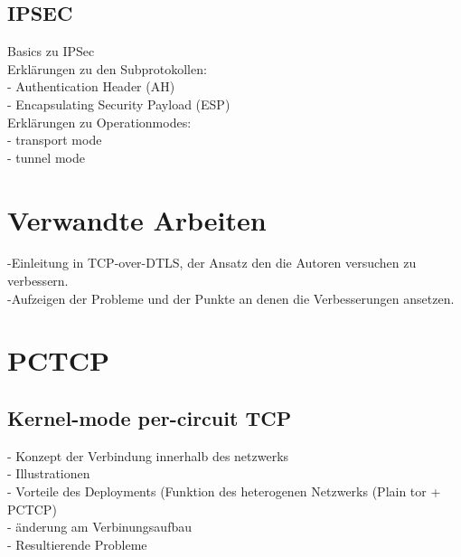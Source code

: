 \documentclass[fleqn,envcountsame,runningheads,10pt,a4paper]{llncs}
\begin{document}
\subsection{IPSEC}
\label{sec:ipsec}

Basics zu IPSec\\
Erklärungen zu den Subprotokollen:\\
- Authentication Header (AH)\\
- Encapsulating Security Payload (ESP)\\
Erklärungen zu Operationmodes:\\
- transport mode\\
- tunnel mode\\

\section{Verwandte Arbeiten}
\label{sec:realtedwork}

-Einleitung in TCP-over-DTLS, der Ansatz den die Autoren versuchen zu verbessern. \\
-Aufzeigen der Probleme und der Punkte an denen die Verbesserungen ansetzen.\\

\section{PCTCP}
\label{sec:pctcp}



\subsection{Kernel-mode per-circuit TCP}
\label{sec:kernelmode}

- Konzept der Verbindung innerhalb des netzwerks\\
- Illustrationen\\
- Vorteile des Deployments (Funktion des heterogenen Netzwerks (Plain tor + PCTCP)\\
- änderung am Verbinungsaufbau\\
- Resultierende Probleme\\

\end{document}
